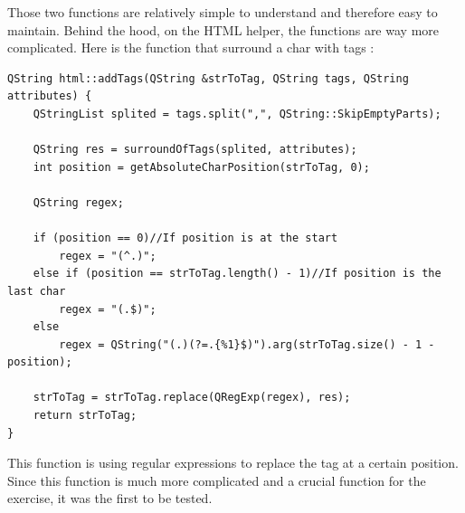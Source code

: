 Those two functions are relatively simple to understand and therefore easy to maintain. Behind the hood, on the HTML helper, the functions are way more complicated.
Here is the function that surround a char with tags :
\begin{lstlisting}
QString html::addTags(QString &strToTag, QString tags, QString attributes) {
    QStringList splited = tags.split(",", QString::SkipEmptyParts);

    QString res = surroundOfTags(splited, attributes);
    int position = getAbsoluteCharPosition(strToTag, 0);

    QString regex;

    if (position == 0)//If position is at the start
        regex = "(^.)";
    else if (position == strToTag.length() - 1)//If position is the last char
        regex = "(.$)";
    else
        regex = QString("(.)(?=.{%1}$)").arg(strToTag.size() - 1 - position);

    strToTag = strToTag.replace(QRegExp(regex), res);
    return strToTag;
}
\end{lstlisting}

This function is using regular expressions to replace the tag at a certain position. Since this function is much more complicated and a crucial function for the exercise, it was the first to be tested.\\

